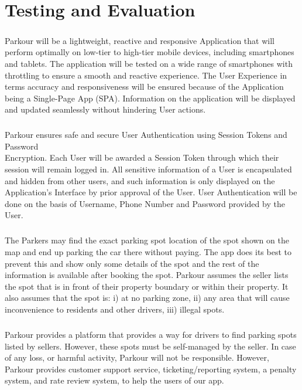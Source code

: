 \chapter{Testing and Evaluation}

    \paragraph*{}
    Parkour will be a lightweight, reactive and responsive Application that will perform optimally on low-tier to high-tier mobile devices, including smartphones and tablets. The application will be tested on a wide range of smartphones with throttling to ensure a smooth and reactive experience. The User Experience in terms accuracy and responsiveness will be ensured because of the Application being a Single-Page App (SPA). Information on the application will be displayed and updated seamlessly without hindering User actions.


    \paragraph*{}
    Parkour ensures safe and secure User Authentication using Session Tokens and Password\\ Encryption. Each User will be awarded a Session Token through which their session will remain logged in. All sensitive information of a User is encapsulated and hidden from other users, and such information is only displayed on the Application’s Interface by prior approval of the User. User Authentication will be done on the basis of Username, Phone Number and Password provided by the User.


    \paragraph*{}
    The Parkers may find the exact parking spot location of the spot shown on the map and end up parking the car there without paying. The app does its best to prevent this and show only some details of the spot and the rest of the information is available after booking the spot. 
    Parkour assumes the seller lists the spot that is in front of their property boundary or within their property. It also assumes that the spot is: i) at no parking zone, ii)  any area that will cause inconvenience to residents and other drivers, iii) illegal spots. 

    \paragraph*{}
    Parkour provides a platform that provides a way for drivers to find parking spots listed by sellers. However, these spots must be self-managed by the seller. In case of any loss, or harmful activity, Parkour will not be responsible. However, Parkour provides customer support service, ticketing/reporting system, a penalty system, and rate review system, to help the users of our app.
